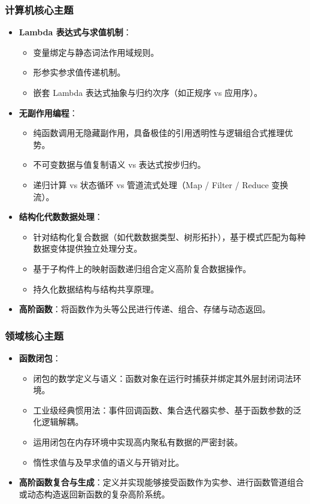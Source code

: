 \subsubsection{计算机核心主题}
\begin{itemize}
    \item \textbf{Lambda 表达式与求值机制}：
    \begin{itemize}
        \item 变量绑定与静态词法作用域规则。
        \item 形参实参求值传递机制。
        \item 嵌套 Lambda 表达式抽象与归约次序（如正规序 vs 应用序）。
    \end{itemize}
    \item \textbf{无副作用编程}：
    \begin{itemize}
        \item 纯函数调用无隐藏副作用，具备极佳的引用透明性与逻辑组合式推理优势。
        \item 不可变数据与值复制语义 vs 表达式按步归约。
        \item 递归计算 vs 状态循环 vs 管道流式处理（Map / Filter / Reduce 变换流）。
    \end{itemize}
    \item \textbf{结构化代数数据处理}：
    \begin{itemize}
        \item 针对结构化复合数据（如代数数据类型、树形拓扑），基于模式匹配为每种数据变体提供独立处理分支。
        \item 基于子构件上的映射函数递归组合定义高阶复合数据操作。
        \item 持久化数据结构与结构共享原理。
    \end{itemize}
    \item \textbf{高阶函数}：将函数作为头等公民进行传递、组合、存储与动态返回。
\end{itemize}

\subsubsection{领域核心主题}
\begin{itemize}
    \item \textbf{函数闭包}：
    \begin{itemize}
        \item 闭包的数学定义与语义：函数对象在运行时捕获并绑定其外层封闭词法环境。
        \item 工业级经典惯用法：事件回调函数、集合迭代器实参、基于函数参数的泛化逻辑解耦。
        \item 运用闭包在内存环境中实现高内聚私有数据的严密封装。
        \item 惰性求值与及早求值的语义与开销对比。
    \end{itemize}
    \item \textbf{高阶函数复合与生成}：定义并实现能够接受函数作为实参、进行函数管道组合或动态构造返回新函数的复杂高阶系统。
\end{itemize}

